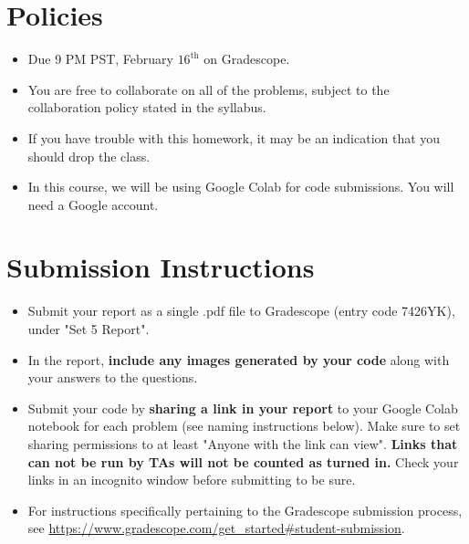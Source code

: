 \newif\ifshowsolutions
\showsolutionstrue







\pagestyle{fancy}





\section*{Policies}
\begin{itemize}
	\item Due 9 PM PST, February $16^\text{th}$ on Gradescope. 
	\item You are free to collaborate on all of the problems, subject to the collaboration policy stated in the syllabus.
	\item If you have trouble with this homework, it may be an indication that you should drop the class.
	\item In this course, we will be using Google Colab for code submissions. You will need a Google account.
\end{itemize}

\section*{Submission Instructions}

\begin{itemize}
	\item Submit your report as a single .pdf file to Gradescope (entry code 7426YK), under "Set 5 Report". 
	\item In the report, \textbf{include any images generated by your code} along with your answers to the questions.
	\item Submit your code by \textbf{sharing a link in your report} to your Google Colab notebook for each problem (see naming instructions below). Make sure to set sharing permissions to at least "Anyone with the link can view". \textbf{Links that can not be run by TAs will not be counted as turned in.} Check your links in an incognito window before submitting to be sure. 
	\item For instructions specifically pertaining to the Gradescope submission process, see \url{https://www.gradescope.com/get_started#student-submission}.
	
\end{itemize}


